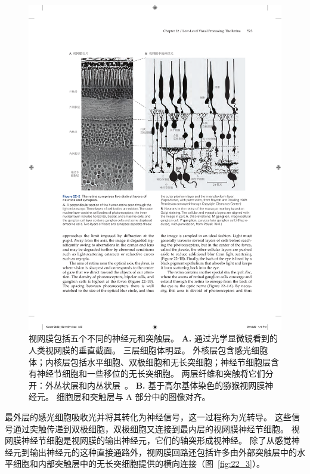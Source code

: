 \begin{figure}[htbp]
	\centering
	\includegraphics[width=1.0\linewidth]{chap22/fig_22_2}
	\caption{视网膜包括五个不同的神经元和突触层。
		\textbf{A.} 通过光学显微镜看到的人类视网膜的垂直截面。
		三层细胞体明显。
		外核层包含感光细胞体；内核层包括水平细胞、双极细胞和无长突细胞；神经节细胞层含有神经节细胞和一些移位的无长突细胞。
		两层纤维和突触将它们分开：外丛状层和内丛状层~\cite{boycott1969organization}。
		\textbf{B.} 基于高尔基体染色的猕猴视网膜神经元。
		细胞层和突触层与 A 部分中的图像对齐\cite{polyak1941retina}。}
	\label{fig:22_2}
\end{figure}


最外层的感光细胞吸收光并将其转化为神经信号，这一过程称为光转导。
这些信号通过突触传递到双极细胞，双极细胞又连接到最内层的视网膜神经节细胞。
视网膜神经节细胞是视网膜的输出神经元，它们的轴突形成视神经。
除了从感觉神经元到输出神经元的这种直接通路外，视网膜回路还包括许多由外部突触层中的水平细胞和内部突触层中的无长突细胞提供的横向连接（图~\ref{fig:22_3}）。


